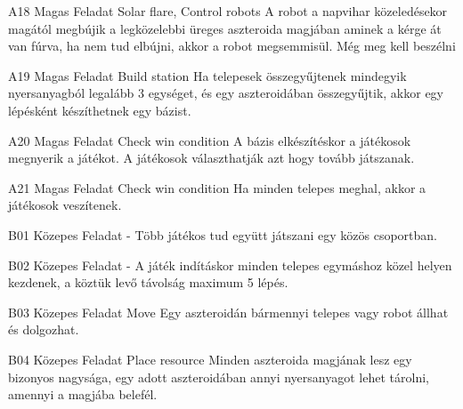 \documentclass[../../projlab]{subfiles}
\begin{document}
\begin{funkovetelmeny}
	{A18}
	{Magas}
	{Feladat}
	{Solar flare, Control robots}
	{}
	{A robot a napvihar közeledésekor magától megbújik a legközelebbi üreges aszteroida magjában aminek a kérge át van fúrva, ha nem tud elbújni, akkor a robot megsemmisül. }
    Még meg kell beszélni
\end{funkovetelmeny}

\begin{funkovetelmeny}
	{A19}
	{Magas}
	{Feladat}
	{Build station}
	{}
	{Ha telepesek összegyűjtenek mindegyik nyersanyagból legalább 3 egységet, és egy aszteroidában összegyűjtik, akkor egy lépésként készíthetnek egy bázist.}
    
\end{funkovetelmeny}

\begin{funkovetelmeny}
	{A20}
	{Magas}
	{Feladat}
	{Check win condition}
	{}
	{A bázis elkészítéskor a játékosok megnyerik a játékot.}
    A játékosok választhatják azt hogy tovább játszanak.
\end{funkovetelmeny}

\begin{funkovetelmeny}
	{A21}
	{Magas}
	{Feladat}
	{Check win condition}
	{}
	{Ha minden telepes meghal, akkor a játékosok veszítenek.}
    
\end{funkovetelmeny}

\begin{funkovetelmeny}
	{B01}
	{Közepes}
	{Feladat}
	{-}
	{}
	{Több játékos tud együtt játszani egy közös csoportban.}
    
\end{funkovetelmeny}

\begin{funkovetelmeny}
	{B02}
	{Közepes}
	{Feladat}
	{-}
	{}
	{A játék indításkor minden telepes egymáshoz közel helyen kezdenek, a köztük levő távolság maximum 5 lépés.}
    
\end{funkovetelmeny}

\begin{funkovetelmeny}
	{B03}
	{Közepes}
	{Feladat}
	{Move}
	{}
	{Egy aszteroidán bármennyi telepes vagy robot állhat és dolgozhat.}
    
\end{funkovetelmeny}

\begin{funkovetelmeny}
	{B04}
	{Közepes}
	{Feladat}
	{Place resource}
	{}
	{Minden aszteroida magjának lesz egy bizonyos nagysága, egy adott aszteroidában annyi nyersanyagot lehet tárolni, amennyi a magjába belefél.}
    
\end{funkovetelmeny}
\end{document}
